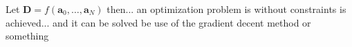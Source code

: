 Let $\textbf{D} = f(\textbf{a}_0, \hdots, \textbf{a}_N)$ then... an optimization problem is without constraints is achieved... and it can be solved be use of the gradient decent method or something

   

